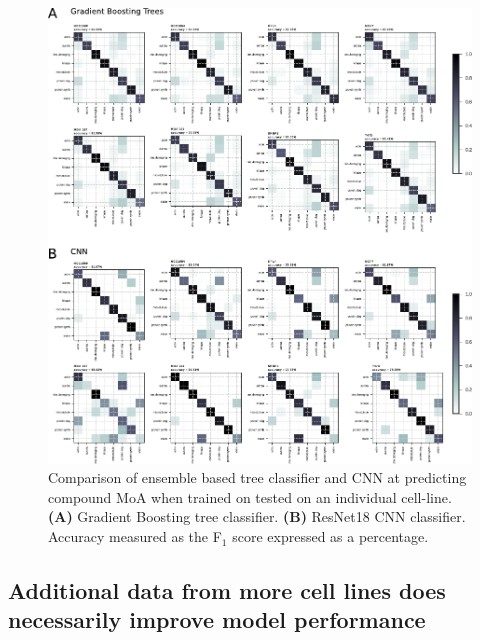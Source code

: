 \documentclass[a4paper,11pt,twoside,openright]{scrbook}
\begin{document}
\begin{figure}
    \includegraphics[width=1.0\textwidth]{ch2SingleCellLine}
    \captionsetup{width=0.8\textwidth}
    \caption[Classifying MoA on a single cell-line]{Comparison of ensemble based tree classifier and CNN at predicting compound MoA when trained on tested on an individual cell-line.
    \textbf{(A)} Gradient Boosting tree classifier.
    \textbf{(B)} ResNet18 CNN classifier.
Accuracy measured as the F$_1$ score expressed as a percentage.
    }
    \label{figure:single_cell_line}
\end{figure}




\subsection{Additional data from more cell lines does necessarily improve model performance}
\end{document}
